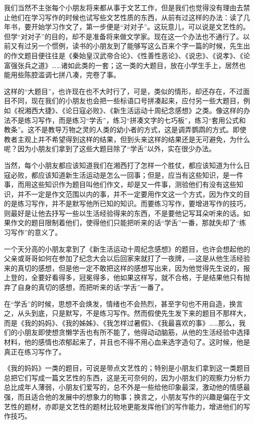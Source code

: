 \documentclass[fontset=fandol,12pt,a5paper]{ctexbook}
\begin{document}
我们当然不主张每个小朋友将来都从事于文艺工作，但是我们也觉得没有理由去禁止他们在学习写作的时候也试写些文艺性质的东西，从前有过这样的办法：读了几年书，要开始学习作文了，第一步便是“对对子”。这玩意儿，可以说是文艺性的。但学“对对子”的目的，却不是准备将来做文学家。现在这一个办法也不通行了。以前又有过另一个惯例，读书的小朋友到了能够写这么百来个字一篇的时候，先生出的作文题目便往往是《秦始皇汉武帝合论》、《性善性恶论》、《说忠》、《说孝》、《论富强张兵之道》……诸如此类的一套；这一类的大题目，放在小学生手上，居然也能用些陈腔滥调七拼八凑，完卷了事。

这样的“大题目”，也许现在也不大时行了，可是，类似的情形，却还存在，不过面目不同，现在我们的小朋友也会把一些标语口号拼凑起来，应付另一些大题目，例如《祝湘西大捷》、《论日寇必败》、《新生活运动十周纪念感想》之类。像这样的办法不是练习写作，而是练习“学舌”，练习“拼凑文字的七巧板”，练习“套用公式和教条”。这不是教导万物之灵的人类的幼小者的方式，这是调弄鹦鹉的方式。即使教者主观上并不希望得到这样的结果，但到头来这样的结果还是无可避免，为什么呢？因为小朋友们拿到了这些大题目除了“学舌”以外，实在很少办法。

当然，每个小朋友都应该知道我们在湘西打了怎样一个胜仗，都应该知道为什么日寇必败，都应该知道新生活运动是怎么一回事；但是，应当有这些知识，是一件事，而用这些知识作为题目叫他们作文，却是又一件事，测验他们有没有这些知识，并不一定是作文范围以内的事，并不一定要用作文这一个方式，因为作文的目的是练习写作，并不是默写他所已知的知识。而要练习写作，要增进写作的技巧，则最好是让他去抒写一些以生活经验得来的东西，不是要他记写耳朵听来的话。如果作文的题目限制着他们，使得他们只能把听来的话“学舌”一番，那就失却了“练习写作”的意义了。

一个天分高的小朋友拿到了《新生活运动十周纪念感想》的题目，也许会想起他的父亲或哥哥如何在参加了纪念大会以后回家来就打了一夜牌，―这是从他生活经验来的真切的感想，但是他一定不敢把这样的感想写出来，因为他觉得先生说的，报上登的，全要好看得多，冠冕得多，他如果这样写，就不合格，于是结果他只有抛弃了自身的真切的感想，而把听来的话“学舌”一番了。

在“学舌”的时候，思想不会焕发，情绪也不会热烈，甚至字句也不用自造，换言之，从头到底，只是默写，不是练习写作。然而假使先生发下来的题目不那样大，而是《我的妈妈》、《我的姊姊》、《我怎样过暑假》、《我最喜欢的事》……那么，我们的小朋友即使想贪懒学舌也有所不能了，他得动动脑筋，从他的生活经验中选择材料，他的感情也浓郁起来了，并且也不得不用心血来选字造句了。这时候，他是真正在练习写作了。

《我的妈妈》一类的题目，可说是带点文艺性的；特别是小朋友们拿到这一类题目总把它们写成一篇文艺性的东西，这是无可奈何的，因为小朋友们的观察力分析力总比成年人薄弱，小朋友们爱写的，总不外是一些给他印象最深，激动他的情感最强，而且适合他的发展中的想象力的物事；换言之，小朋友写作的兴趣是偏在于文艺性的题材，亦即是文艺性的题材比较地更能发挥他们的写作能力，增进他们的写作技巧。
\end{document}
